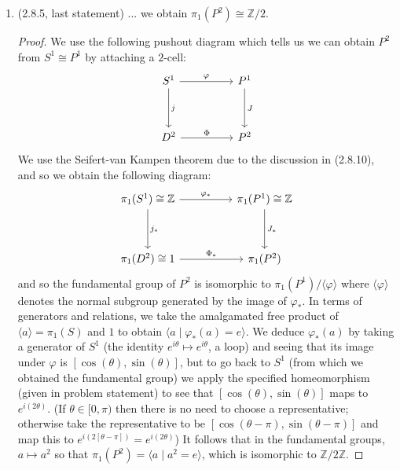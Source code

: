 \documentclass[11pt]{article}
\begin{document}
\begin{enumerate}
\begin{proof}
  Since (2.6.2) is a pushout the above is true for $j_{1\ast}$ whenever $i_{0\ast}$ is an isomorphism (epimorphism).
    \end{proof}
    \item (2.8.5, last statement) ... we obtain $\pi_1(P^2)\cong \mathbb{Z}/2$. \begin{proof}
      We use the following pushout diagram which tells us we can obtain $P^2$ from $S^1\cong P^1$ by attaching a $2$-cell: %
      \[\begin{tikzcd}
        {S^1} && {P^1} \\
        \\
        D^2 && {P^2}
        \arrow["\varphi", from=1-1, to=1-3]
        \arrow["j", from=1-1, to=3-1]
        \arrow["\Phi", from=3-1, to=3-3]
        \arrow["J", from=1-3, to=3-3]
      \end{tikzcd}\] We use the Seifert-van Kampen theorem due to the discussion in (2.8.10), and so we obtain the following diagram: %
      \[\begin{tikzcd}
        {\pi_1(S^1)\cong \mathbb{Z}} && {\pi_1(P^1)\cong\mathbb{Z}} \\
        \\
        {\pi_1(D^2)\cong 1} && {\pi_1(P^2)}
        \arrow["{\varphi_\ast}", from=1-1, to=1-3]
        \arrow["{j_\ast}", from=1-1, to=3-1]
        \arrow["{\Phi_\ast}", from=3-1, to=3-3]
        \arrow["{J_\ast}", from=1-3, to=3-3]
      \end{tikzcd}\] and so the fundamental group of $P^2$ is isomorphic to $\pi_1(P^1)/\langle\varphi\rangle$ where $\langle\varphi\rangle$ denotes the normal subgroup generated by the image of $\varphi_\ast$. In terms of generators and relations, we take the amalgamated free product of $\langle a \rangle = \pi_1(S)$ and $1$ to obtain $\langle a\mid \varphi_\ast(a) = e \rangle$. We deduce $\varphi_\ast(a)$ by taking a generator of $S^1$ (the identity $e^{i\theta}\mapsto e^{i\theta}$, a loop) and seeing that its image under $\varphi$ is $[\cos(\theta),\sin(\theta)]$, but to go back to $S^1$ (from which we obtained the fundamental group) we apply the specified homeomorphism (given in problem statement) to see that $[\cos(\theta),\sin(\theta)]$ maps to $e^{i(2\theta)}$. (If $\theta\in[0,\pi)$ then there is no need to choose a representative; otherwise take the representative to be $[\cos(\theta-\pi),\sin(\theta-\pi)]$ and map this to $e^{i(2[\theta-\pi])} = e^{i(2\theta)}$) It follows that in the fundamental groups, $a\mapsto a^2$ so that $\pi_1(P^2) = \langle a\mid a^2 = e \rangle$, which is isomorphic to $\mathbb{Z}/2\mathbb{Z}$.

\end{proof}
\end{enumerate}
\end{document}
